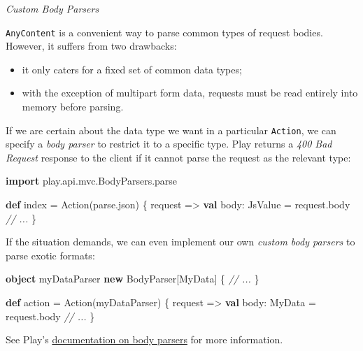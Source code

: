 \documentclass[oneside,11pt,a4paper,]{book}
\newenvironment{Shaded}{\begin{snugshade}}{\end{snugshade}}
\newcommand{\KeywordTok}[1]{\textcolor[rgb]{0.13,0.29,0.53}{\textbf{{#1}}}}
\newcommand{\CommentTok}[1]{\textcolor[rgb]{0.56,0.35,0.01}{\textit{{#1}}}}
\newcommand{\FunctionTok}[1]{\textcolor[rgb]{0.00,0.00,0.00}{{#1}}}
\newcommand{\NormalTok}[1]{{#1}}
\begin{document}
\begin{WarningCallout}

\emph{Custom Body Parsers}

\texttt{AnyContent} is a convenient way to parse common types of request
bodies. However, it suffers from two drawbacks:

\begin{itemize}
\itemsep1pt\parskip0pt
\item
  it only caters for a fixed set of common data types;
\item
  with the exception of multipart form data, requests must be read
  entirely into memory before parsing.
\end{itemize}

If we are certain about the data type we want in a particular
\texttt{Action}, we can specify a \emph{body parser} to restrict it to a
specific type. Play returns a \emph{400 Bad Request} response to the
client if it cannot parse the request as the relevant type:

\begin{Shaded}
\begin{Highlighting}[]
\KeywordTok{import} \NormalTok{play.}\FunctionTok{api}\NormalTok{.}\FunctionTok{mvc}\NormalTok{.}\FunctionTok{BodyParsers}\NormalTok{.}\FunctionTok{parse}

\KeywordTok{def} \NormalTok{index = Action(parse.}\FunctionTok{json}\NormalTok{) \{ request =>}
  \KeywordTok{val} \NormalTok{body: JsValue = request.}\FunctionTok{body}
  \CommentTok{// ...}
\NormalTok{\}}
\end{Highlighting}
\end{Shaded}

If the situation demands, we can even implement our own \emph{custom
body parsers} to parse exotic formats:

\begin{Shaded}
\begin{Highlighting}[]
\KeywordTok{object} \NormalTok{myDataParser }\KeywordTok{new} \NormalTok{BodyParser[MyData] \{}
  \CommentTok{// ...}
\NormalTok{\}}

\KeywordTok{def} \NormalTok{action = Action(myDataParser) \{ request =>}
  \KeywordTok{val} \NormalTok{body: MyData = request.}\FunctionTok{body}
  \CommentTok{// ...}
\NormalTok{\}}
\end{Highlighting}
\end{Shaded}

See Play's
\href{https://www.playframework.com/documentation/2.3.x/ScalaBodyParsers}{documentation
on body parsers} for more information.

\end{WarningCallout}
\end{document}
